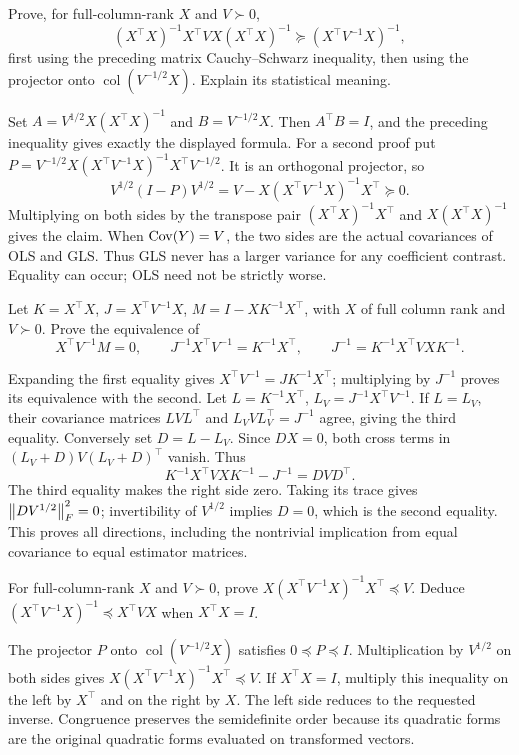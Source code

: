 \begin{problem}
Prove, for full-column-rank $X$ and $V\succ0$,
\[
(X^\top X)^{-1}X^\top VX(X^\top X)^{-1}
\succeq(X^\top V^{-1}X)^{-1},
\]
first using the preceding matrix Cauchy--Schwarz inequality, then using
the projector onto $\operatorname{col}(V^{-1/2}X)$. Explain its statistical meaning.
\end{problem}
\begin{solution}
Set $A=V^{1/2}X(X^\top X)^{-1}$ and $B=V^{-1/2}X$. Then $A^\top B=I$,
and the preceding inequality gives exactly the displayed formula.
For a second proof put
$P=V^{-1/2}X(X^\top V^{-1}X)^{-1}X^\top V^{-1/2}$.
It is an orthogonal projector, so
\[
V^{1/2}(I-P)V^{1/2}
=V-X(X^\top V^{-1}X)^{-1}X^\top\succeq0.
\]
Multiplying on both sides by the transpose pair
$(X^\top X)^{-1}X^\top$ and $X(X^\top X)^{-1}$ gives the claim.
When $\operatorname{Cov}(Y)=V$, the two sides are the actual covariances of OLS and
GLS. Thus GLS never has a larger variance for any coefficient contrast.
Equality can occur; OLS need not be strictly worse.
\end{solution}

\begin{problem}\label{ex:11:agreement}
Let $K=X^\top X$, $J=X^\top V^{-1}X$, $M=I-XK^{-1}X^\top$, with
$X$ of full column rank and $V\succ0$. Prove the equivalence of
\[
X^\top V^{-1}M=0,\qquad
J^{-1}X^\top V^{-1}=K^{-1}X^\top,\qquad
J^{-1}=K^{-1}X^\top VXK^{-1}.
\]
\end{problem}
\begin{solution}
Expanding the first equality gives
$X^\top V^{-1}=JK^{-1}X^\top$; multiplying by $J^{-1}$ proves its
equivalence with the second. Let $L=K^{-1}X^\top$, $L_V=J^{-1}X^\top V^{-1}$.
If $L=L_V$, their covariance matrices $LVL^\top$ and
$L_VVL_V^\top=J^{-1}$ agree, giving the third equality.
Conversely set $D=L-L_V$. Since $DX=0$, both cross terms in
$(L_V+D)V(L_V+D)^\top$ vanish. Thus
\[
K^{-1}X^\top VXK^{-1}-J^{-1}=DVD^\top.
\]
The third equality makes the right side zero. Taking its trace gives
$\left\lVert DV^{1/2}\right\rVert_F^2=0$; invertibility of $V^{1/2}$ implies $D=0$,
which is the second equality. This proves all directions, including the
nontrivial implication from equal covariance to equal estimator matrices.
\end{solution}

\begin{problem}
For full-column-rank $X$ and $V\succ0$, prove
$X(X^\top V^{-1}X)^{-1}X^\top\preceq V$.
Deduce $(X^\top V^{-1}X)^{-1}\preceq X^\top VX$ when $X^\top X=I$.
\end{problem}
\begin{solution}
The projector $P$ onto $\operatorname{col}(V^{-1/2}X)$ satisfies
$0\preceq P\preceq I$. Multiplication by $V^{1/2}$ on both sides gives
$X(X^\top V^{-1}X)^{-1}X^\top\preceq V$.
If $X^\top X=I$, multiply this inequality on the left by $X^\top$ and
on the right by $X$. The left side reduces to the requested inverse.
Congruence preserves the semidefinite order because its quadratic forms
are the original quadratic forms evaluated on transformed vectors.
\end{solution}

